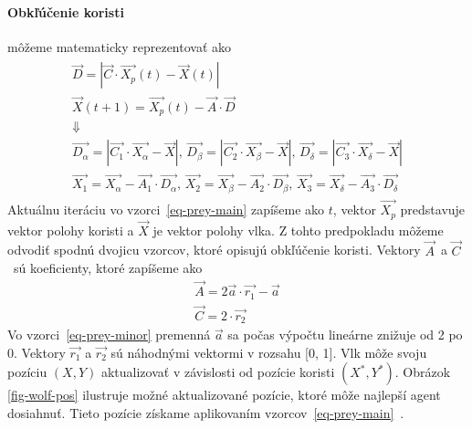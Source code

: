 \documentclass[a4paper,slovak,12pt,appendix]{article}
\begin{document}
\paragraph{Obkľúčenie koristi} môžeme matematicky reprezentovať ako
\begin{equation}
  \begin{split}
    \begin{gathered}
      \vec{D} = | \vec{C} \cdot \vec{X_p}(t) - \vec{X}(t) |
      \\
      \vec{X}(t+1) = \vec{X_p}(t) - \vec{A} \cdot \vec{D}
      \\
      \Downarrow
      \\
      \vec{D_\alpha} = | \vec{C_1} \cdot \vec{X_\alpha} - \vec{X} |\text{,  }\vec{D_\beta} = | \vec{C_2} \cdot \vec{X_\beta} - \vec{X} |\text{,  }\vec{D_\delta} = | \vec{C_3} \cdot \vec{X_\delta} - \vec{X} |
      \\
      \vec{X_1} = \vec{X_\alpha} - \vec{A_1} \cdot \vec{D_\alpha}\text{,  }\vec{X_2} = \vec{X_\beta} - \vec{A_2} \cdot \vec{D_\beta}\text{,  }\vec{X_3} = \vec{X_\delta} - \vec{A_3} \cdot \vec{D_\delta}
    \end{gathered}
  \end{split}
  \label{eq-prey-main}
\end{equation}
Aktuálnu iteráciu vo vzorci~\ref{eq-prey-main} zapíšeme ako $t$, vektor
$\vec{X_p}$ predstavuje vektor polohy koristi a $\vec{X}$ je vektor polohy
vlka. Z tohto predpokladu môžeme odvodiť spodnú dvojicu vzorcov, ktoré opisujú
obkľúčenie koristi. Vektory $\vec{A}$ a $\vec{C}$ sú koeficienty, ktoré
zapíšeme ako
\begin{equation}
  \begin{split}
    \vec{A} = 2\vec{a} \cdot \vec{r_1} - \vec{a}
    \\
    \vec{C} = 2 \cdot \vec{r_2}
  \end{split}
  \label{eq-prey-minor}
\end{equation}
Vo vzorci~\ref{eq-prey-minor} premenná $\vec{a}$ sa počas výpočtu lineárne
znižuje od 2 po 0. Vektory $\vec{r_1}$ a $\vec{r_2}$ sú náhodnými vektormi
v rozsahu [0, 1]. Vlk môže svoju pozíciu $(X, Y)$ aktualizovať v závislosti od
pozície koristi $(X^*, Y^*)$. Obrázok \ref{fig-wolf-pos} ilustruje možné
aktualizované pozície, ktoré môže najlepší agent dosiahnuť. Tieto pozície
získame aplikovaním vzorcov~\ref{eq-prey-main}~\cite{Seeley1991}.
\end{document}
